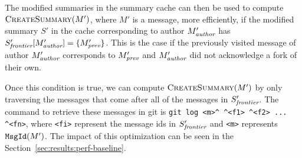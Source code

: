 The modified summaries in the summary cache can then be used to compute $\textsc{CreateSummary}(M')$, where $M'$ is a message, more efficiently, if the modified summary $S'$ in the cache corresponding to author $M'_\emph{author}$ has $S'_\emph{frontier}[M'_\emph{author}] = \{M'_\emph{prev}\}$. This is the case if the previously visited message of author $M'_\emph{author}$ corresponds to $M'_\emph{prev}$ and $M'_\emph{author}$ did not acknowledge a fork of their own.

Once this condition is true, we can compute $\textsc{CreateSummary}(M')$ by only traversing the messages that come after all of the messages in $S'_\emph{frontier}$. The command to retrieve these messages in git is \texttt{git log <m>\^{} \^{}<f1> \^{}<f2> ... \^{}<fn>}, where \texttt{<fi>} represent the message ids in $S'_\emph{frontier}$ and \texttt{<m>} represents $\texttt{MsgId}(M')$.  The impact of this optimization can be seen in the Section~\ref{sec:results:perf-baseline}.



